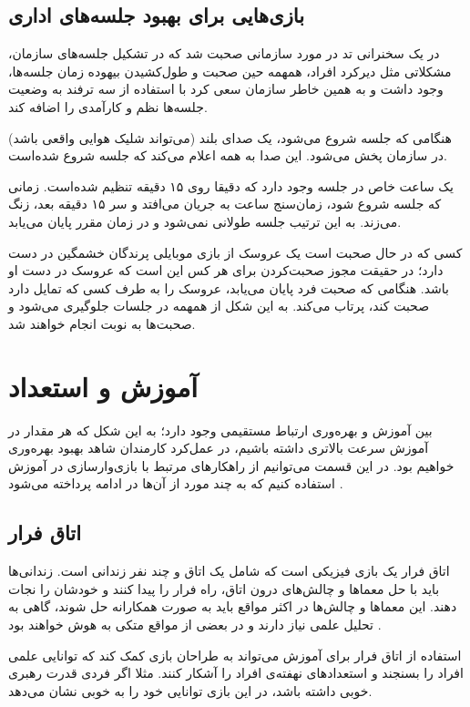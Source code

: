 \subsection{بازی‌هایی برای بهبود جلسه‌های اداری}
در یک سخنرانی تد \cite{tedx} در مورد سازمانی صحبت شد که در تشکیل جلسه‌های سازمان، مشکلاتی مثل دیرکرد افراد، همهمه حین صحبت و طول‌کشیدن بیهوده زمان جلسه‌ها، وجود داشت و به همین خاطر سازمان سعی کرد با استفاده از سه ترفند به وضعیت جلسه‌ها نظم و کارآمدی را اضافه کند.
\begin{trick}
هنگامی که جلسه شروع می‌شود، یک صدای بلند (می‌تواند شلیک هوایی واقعی باشد) در سازمان پخش می‌شود. این صدا به همه اعلام می‌کند که جلسه شروع شده‌است.
\end{trick}
\begin{trick}
یک ساعت خاص در جلسه وجود دارد که دقیقا روی ۱۵ دقیقه تنظیم شده‌است. زمانی که جلسه شروع شود، زمان‌سنج ساعت به جریان می‌افتد و سر ۱۵ دقیقه بعد، زنگ می‌زند. به این ترتیب جلسه طولانی نمی‌شود و در زمان مقرر پایان می‌یابد.
\end{trick}
\begin{trick}
کسی که در حال صحبت است یک عروسک از بازی موبایلی پرندگان خشمگین در دست دارد؛ در حقیقت مجوز صحبت‌کردن برای هر کس این است که عروسک در دست او باشد. هنگامی که صحبت فرد پایان می‌یابد، عروسک را به طرف کسی که تمایل دارد صحبت کند، پرتاب می‌کند. به این شکل از همهمه در جلسات جلوگیری می‌شود و صحبت‌ها به نوبت انجام خواهند شد.
\end{trick}
\section{آموزش و استعداد}
بین آموزش و بهره‌وری ارتباط مستقیمی وجود دارد؛ به این شکل که هر مقدار در آموزش سرعت بالاتری داشته باشیم، در عمل‌کرد کارمندان شاهد بهبود بهره‌وری خواهیم بود. در این قسمت می‌توانیم از راهکارهای مرتبط با بازی‌وارسازی در آموزش استفاده کنیم که به چند مورد از آن‌ها در ادامه پرداخته می‌شود \cite{amiriamin}.
\subsection{اتاق فرار\protect{}}
اتاق فرار یک بازی فیزیکی است که شامل یک اتاق و چند نفر زندانی است. زندانی‌ها باید با حل معماها و چالش‌های درون اتاق، راه فرار را پیدا کنند و خودشان را نجات دهند. این معماها و چالش‌ها در اکثر مواقع باید به صورت همکارانه حل شوند، گاهی به تحلیل علمی نیاز دارند و در بعضی از مواقع متکی به هوش خواهند بود \cite{atoz}.

استفاده از اتاق فرار برای آموزش می‌تواند به طراحان بازی کمک کند که توانایی علمی افراد را بسنجند و استعدادهای نهفته‌ی افراد را آشکار کنند. مثلا اگر فردی قدرت رهبری خوبی داشته باشد، در این بازی توانایی خود را به خوبی نشان می‌دهد.
